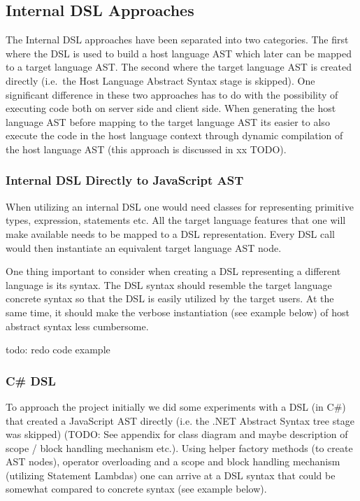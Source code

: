 	\subsection{Internal DSL Approaches} %
	\label{ssub:internal_dsl_approaches}

		The Internal DSL approaches have been separated into two categories. The first where the DSL is used to build a host language AST which later can be mapped to a target language AST. The second where the target language AST is created directly (i.e.\ the Host Language Abstract Syntax stage is skipped). One significant difference in these two approaches has to do with the possibility of executing code both on server side and client side. When generating the host language AST before mapping to the target language AST its easier to also execute the code in the host language context through dynamic compilation of the host language AST (this approach is discussed in xx TODO).
	
		\subsubsection{Internal DSL Directly to JavaScript AST} %
		\label{sub:internal_dsl_directly_to_javascript_ast}
		
			When utilizing an internal DSL one would need classes for representing primitive types, expression, statements etc. All the target language features that one will make available needs to be mapped to a DSL representation. Every DSL call would then instantiate an equivalent target language AST node.

			One thing important to consider when creating a DSL representing a different language is its syntax. The DSL syntax should resemble the target language concrete syntax so that the DSL is easily utilized by the target users. At the same time, it should make the verbose instantiation (see example below) of host abstract syntax less cumbersome.

			todo: redo code example


		\subsubsection{C\# DSL} %
		\label{sub:cs_dsl}

			To approach the project initially we did some experiments with a DSL (in C\#) that created a JavaScript AST directly (i.e. the .NET Abstract Syntax tree stage was skipped) (TODO: See appendix for class diagram and maybe description of scope / block handling mechanism etc.). Using helper factory methods (to create AST nodes), operator overloading and a scope and block handling mechanism (utilizing Statement Lambdas) one can arrive at a DSL syntax that could be somewhat compared to concrete syntax (see example below).

